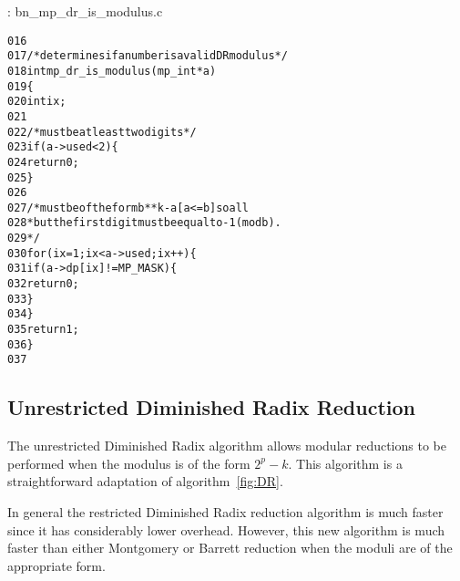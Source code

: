 \documentclass[b5paper]{book}
\begin{document}
\vspace{+3mm}\begin{small}
\hspace{-5.1mm}{\bf File}: bn\_mp\_dr\_is\_modulus.c
\vspace{-3mm}
\begin{alltt}
016   
017   /* determines if a number is a valid DR modulus */
018   int mp_dr_is_modulus(mp_int *a)
019   \{
020      int ix;
021   
022      /* must be at least two digits */
023      if (a->used < 2) \{
024         return 0;
025      \}
026   
027      /* must be of the form b**k - a [a <= b] so all
028       * but the first digit must be equal to -1 (mod b).
029       */
030      for (ix = 1; ix < a->used; ix++) \{
031          if (a->dp[ix] != MP_MASK) \{
032             return 0;
033          \}
034      \}
035      return 1;
036   \}
037   
\end{alltt}
\end{small}

\subsection{Unrestricted Diminished Radix Reduction}
The unrestricted Diminished Radix algorithm allows modular reductions to be performed when the modulus is of the form $2^p - k$.  This algorithm
is a straightforward adaptation of algorithm~\ref{fig:DR}.

In general the restricted Diminished Radix reduction algorithm is much faster since it has considerably lower overhead.  However, this new
algorithm is much faster than either Montgomery or Barrett reduction when the moduli are of the appropriate form.
\end{document}
